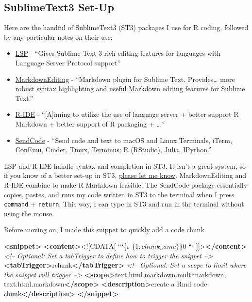 \documentclass[]{book}
\newenvironment{Shaded}{\begin{snugshade}}{\end{snugshade}}
\newcommand{\BaseNTok}[1]{\textcolor[rgb]{0.00,0.00,0.81}{#1}}
\newcommand{\CommentTok}[1]{\textcolor[rgb]{0.56,0.35,0.01}{\textit{#1}}}
\newcommand{\KeywordTok}[1]{\textcolor[rgb]{0.13,0.29,0.53}{\textbf{#1}}}
\newcommand{\NormalTok}[1]{#1}
\providecommand{\tightlist}{%
  \setlength{\itemsep}{0pt}\setlength{\parskip}{0pt}}
\begin{document}
\hypertarget{sublimetext3-set-up}{%
\subsection{SublimeText3 Set-Up}\label{sublimetext3-set-up}}

Here are the handful of SublimeText3 (ST3) packages I use for R coding, followed by any particular notes on their use:

\begin{itemize}
\tightlist
\item
  \href{https://packagecontrol.io/packages/LSP}{LSP} - ``Gives Sublime Text 3 rich editing features for languages with Language Server Protocol support''
\item
  \href{https://packagecontrol.io/packages/MarkdownEditing}{MarkdownEditing} - ``Markdown plugin for Sublime Text. Provides\ldots{} more robust syntax highlighting and useful Markdown editing features for Sublime Text.''
\item
  \href{https://packagecontrol.io/packages/R-IDE}{R-IDE} - ``{[}A{]}iming to utilize the use of language server + better support R Markdown + better support of R packaging + \ldots{}''
\item
  \href{https://packagecontrol.io/packages/SendCode}{SendCode} - ``Send code and text to macOS and Linux Terminals, iTerm, ConEmu, Cmder, Tmux, Terminus; R (RStudio), Julia, IPython.''
\end{itemize}

LSP and R-IDE handle syntax and completion in ST3. It isn't a great system, so if you know of a better set-up in ST3, \href{https://github.com/jhrcook/package-as-analysis/issues}{please let me know}. MarkdownEditing and R-IDE combine to make R Markdown feasible. The SendCode package essentially copies, pastes, and runs my code written in ST3 to the terminal when I press \texttt{command} + \texttt{return}. This way, I can type in ST3 and run in the terminal without using the mouse.

Before moving on, I made this snippet to quickly add a code chunk.

\begin{Shaded}
\begin{Highlighting}[]
\KeywordTok{<snippet>}
        \KeywordTok{<content>}\BaseNTok{<![CDATA[}
\NormalTok{```\{r $\{1:chunk_name\}\}}
\NormalTok{$0}
\NormalTok{```}
\BaseNTok{]]>}\KeywordTok{</content>}
        \CommentTok{<!-- Optional: Set a tabTrigger to define how to trigger the snippet -->}
        \KeywordTok{<tabTrigger>}\NormalTok{rchunk}\KeywordTok{</tabTrigger>}
        \CommentTok{<!-- Optional: Set a scope to limit where the snippet will trigger -->}
        \KeywordTok{<scope>}\NormalTok{text.html.markdown.multimarkdown, text.html.markdown}\KeywordTok{</scope>}
        \KeywordTok{<description>}\NormalTok{create a Rmd code chunk}\KeywordTok{</description>}
\KeywordTok{</snippet>}
\end{Highlighting}
\end{Shaded}
\end{document}
